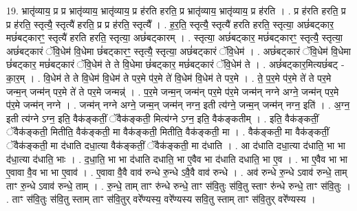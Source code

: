 \documentclass[17pt]{extarticle}
\begin{document}
19. भ्रातृ॑व्याय॒ प्र प्र भ्रातृ॑व्याय॒ भ्रातृ॑व्याय॒ प्र ह॑रति हरति॒ प्र भ्रातृ॑व्याय॒ भ्रातृ॑व्याय॒ प्र ह॑रति । . प्र ह॑रति हरति॒ प्र प्र ह॑रति॒ स्तृत्यै॒ स्तृत्यै॑ हरति॒ प्र प्र ह॑रति॒ स्तृत्यै᳚ । . ह॒र॒ति॒ स्तृत्यै॒ स्तृत्यै॑ हरति हरति॒ स्तृत्या॒ अछं॑बट्कार॒ मछं॑बट्कारꣳ॒॒ स्तृत्यै॑ हरति हरति॒ स्तृत्या॒ अछं॑बट्कारम् । . स्तृत्या॒ अछं॑बट्कार॒ मछं॑बट्कारꣳ॒॒ स्तृत्यै॒ स्तृत्या॒ अछं॑बट्कारं ॅवि॒धेम॑ वि॒धेमा छं॑बट्कारꣳ॒॒ स्तृत्यै॒ स्तृत्या॒ अछं॑बट्कारं ॅवि॒धेम॑ । . अछं॑बट्कारं ॅवि॒धेम॑ वि॒धेमा छं॑बट्कार॒ मछं॑बट्कारं ॅवि॒धेम॑ ते ते वि॒धेमा छं॑बट्कार॒ मछं॑बट्कारं ॅवि॒धेम॑ ते । . अछं॑बट्कार॒मित्यछं॑बट् - का॒र॒म् । . वि॒धेम॑ ते ते वि॒धेम॑ वि॒धेम॑ ते पर॒मे प॑र॒मे ते॑ वि॒धेम॑ वि॒धेम॑ ते पर॒मे । . ते॒ प॒र॒मे प॑र॒मे ते॑ ते पर॒मे जन्म॒न् जन्म॑न् पर॒मे ते॑ ते पर॒मे जन्मन्न्॑ । . प॒र॒मे जन्म॒न् जन्म॑न् पर॒मे प॑र॒मे जन्म॑न् नग्ने अग्ने॒ जन्म॑न् पर॒मे प॑र॒मे जन्म॑न् नग्ने । . जन्म॑न् नग्ने अग्ने॒ जन्म॒न् जन्म॑न् नग्न॒ इती त्य॑ग्ने॒ जन्म॒न् जन्म॑न् नग्न॒ इति॑ । . अ॒ग्न॒ इती त्य॑ग्ने ऽग्न॒ इति॒ वैक॑ङ्कतीं॒ ॅवैक॑ङ्कती॒ मित्य॑ग्ने ऽग्न॒ इति॒ वैक॑ङ्कतीम् । . इति॒ वैक॑ङ्कतीं॒ ॅवैक॑ङ्कती॒ मितीति॒ वैक॑ङ्कती॒ मा वैक॑ङ्कती॒ मितीति॒ वैक॑ङ्कती॒ मा । . वैक॑ङ्कती॒ मा वैक॑ङ्कतीं॒ ॅवैक॑ङ्कती॒ मा द॑धाति दधा॒त्या वैक॑ङ्कतीं॒ ॅवैक॑ङ्कती॒ मा द॑धाति । . आ द॑धाति दधा॒त्या द॑धाति॒ भा भा द॑धा॒त्या द॑धाति॒ भाः । . द॒धा॒ति॒ भा भा द॑धाति दधाति॒ भा ए॒वैव भा द॑धाति दधाति॒ भा ए॒व । . भा ए॒वैव भा भा ए॒वावा वै॒व भा भा ए॒वाव॑ । . ए॒वावा वै॒वै वाव॑ रुन्धे रु॒न्धे ऽवै॒वै वाव॑ रुन्धे । . अव॑ रुन्धे रु॒न्धे ऽवाव॑ रुन्धे॒ ताम् ताꣳ रु॒न्धे ऽवाव॑ रुन्धे॒ ताम् । . रु॒न्धे॒ ताम् ताꣳ रु॑न्धे रुन्धे॒ ताꣳ स॑वि॒तुः स॑वि॒तु स्ताꣳ रु॑न्धे रुन्धे॒ ताꣳ स॑वि॒तुः । . ताꣳ स॑वि॒तुः स॑वि॒तु स्ताम् ताꣳ स॑वि॒तुर् वरे᳚ण्यस्य॒ वरे᳚ण्यस्य सवि॒तु स्ताम् ताꣳ स॑वि॒तुर् वरे᳚ण्यस्य । \newline
\end{document}
